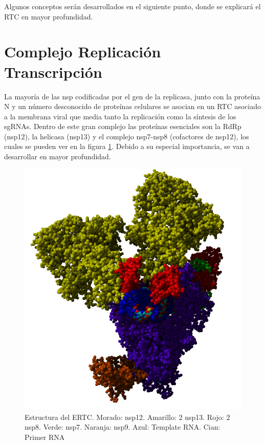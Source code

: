 \documentclass[a4paper,11pt]{report}
\begin{document}
 Algunos conceptos serán desarrollados en el siguiente punto, donde se explicará el RTC en mayor profundidad.

 
 \section{Complejo Replicación Transcripción}
 La mayoría de las nsp codificadas por el gen de la replicasa, junto con la proteína N y un número desconocido de proteínas celulares se asocian en un RTC asociado a la membrana viral que media tanto la replicación como la síntesis de los sgRNAs. Dentro de este gran complejo las proteínas esenciales son la RdRp (nsp12), la helicasa (nsp13) y el complejo nsp7-nsp8 (cofactores de nsp12), los cuales se pueden ver en la figura \ref{todos}. Debido a su especial importancia, se van a desarrollar en mayor profundidad.
 
 \begin{figure} [h]
 	\centering
 	\includegraphics[width=0.4\linewidth]{Figuras/Figura38}
 	\caption{Estructura del ERTC. Morado: nsp12. Amarillo: 2 nsp13. Rojo: 2 nsp8. Verde: nsp7. Naranja: nsp9. Azul: Template RNA. Cian: Primer RNA}
 	\label{todos}	
 \end{figure}
\end{document}
